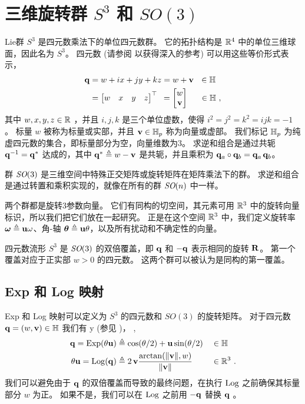 
\section{三维旋转群 $S^3$ 和 $SO(3)$}
\label{sec:S3_SO3}

Lie群 $S^3$ 是四元数乘法下的单位四元数群。
它的拓扑结构是 ${\mathbb R}^4$ 中的单位三维球面，因此名为 $S^3$。
四元数 (请参阅 \cite{SOLA-17-Quaternion} 以获得深入的参考) 可以用这些等价形式表示，
%
\begin{align}
\begin{split}		
{\bf q} 
&= w+ix+jy+kz
=w+{\bf v} ~~ \in{\mathbb H}
\\
&
=\begin{bmatrix}w&x&y&z\end{bmatrix}^{\top} 
~\,=\begin{bmatrix}w\\{\bf v}\end{bmatrix} \quad~\, \in{\mathbb H}
~,
\end{split}
\end{align}
%
其中 $w,x,y,z\in{\mathbb R}$ ，并且 $i,j,k$ 是三个单位虚数，使得 $i^2=j^2=k^2=ijk=-1$ 。
标量 $w$ 被称为标量或实部，并且 ${\bf v}\in{\mathbb H}_p$ 称为向量或虚部。
我们标记 ${\mathbb H}_p$ 为纯虚四元数的集合，即标量部分为空，向量维数为3。
求逆和组合是通过共轭 ${\bf q}^{-1} = {\bf q}^*$ 达成的，其中 ${\bf q}^*\triangleq w-{\bf v}$ 是共轭，并且乘积为 ${\bf q}_a\circ{\bf q}_b = {\bf q}_a\,{\bf q}_b$。

群 $\textit{SO}(3)$ 是三维空间中特殊正交矩阵或旋转矩阵在矩阵乘法下的群。
求逆和组合是通过转置和乘积实现的，就像在所有的群 $\textit{SO}(n)$ 中一样。

两个群都是旋转$3$参数向量。 
它们有同构的切空间，其元素可用 ${\mathbb R}^3$ 中的旋转向量标识，所以我们把它们放在一起研究。
正是在这个空间 ${\mathbb R}^3$ 中，我们定义旋转率 ${{\bm \omega}}\triangleq{\bf u}\omega$、角-轴 ${{\bm \theta}}\triangleq{\bf u}\theta$，以及所有扰动和不确定性的向量。

四元数流形 $S^3$ 是 $\textit{SO}(3)$ 的双倍覆盖，即 ${\bf q}$ 和 $-{\bf q}$ 表示相同的旋转 ${\bf R}$。
第一个覆盖对应于正实部 $w>0$ 的四元数。
这两个群可以被认为是同构的第一覆盖。




\subsection{Exp 和 Log 映射}

Exp 和 Log 映射可以定义为 $S^3$ 的四元数和 $SO(3)$ 的旋转矩阵。
对于四元数 ${\bf q}=(w,{\bf v})\in{\mathbb H}$ 我们有%
%
\if \examples y (参见 )， \else, \fi
%
%
\begin{align}
{\bf q}= \operatorname*{Exp}(\theta{\bf u}) &\triangleq \cos(\theta/2) + {\bf u}\sin(\theta/2) &&\in{\mathbb H}\\ 
\theta{\bf u} = \operatorname*{Log}({\bf q}) &\triangleq 2\,{\bf v}\frac{\arctan({{\left\|{\bf v}\right\|},w})}{{\left\|{\bf v}\right\|}}&&\in{\mathbb R}^3
~.
\end{align}
%
我们可以避免由于 ${\bf q}$ 的双倍覆盖而导致的最终问题，在执行 $\operatorname*{Log}$ 之前确保其标量部分 $w$ 为正。
如果不是，我们可以在 $\operatorname*{Log}$ 之前用 $-{\bf q}$ 替换 ${\bf q}$ 。

